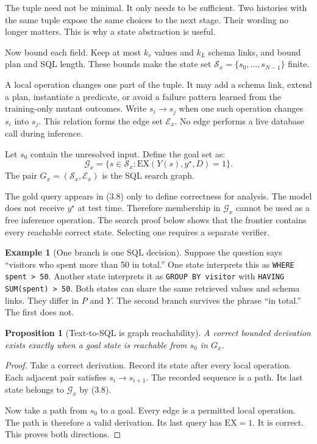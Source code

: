 \documentclass[11pt]{article}
\newtheorem{proposition}[theorem]{Proposition}
\theoremstyle{definition}
\newtheorem{example}[theorem]{Example}
\begin{document}
The tuple need not be minimal. It only needs to be sufficient. Two histories with the same tuple expose the same choices to the next stage. Their wording no longer matters. This is why a state abstraction is useful.

Now bound each field. Keep at most $k_v$ values and $k_L$ schema links, and bound plan and SQL length. These bounds make the state set $\mathcal S_x=\{s_0,\ldots,s_{N-1}\}$ finite.

A local operation changes one part of the tuple. It may add a schema link, extend a plan, instantiate a predicate, or avoid a failure pattern learned from the training-only mutant outcomes. Write $s_i\to s_j$ when one such operation changes $s_i$ into $s_j$. This relation forms the edge set $\mathcal E_x$. No edge performs a live database call during inference.

Let $s_0$ contain the unresolved input. Define the goal set as:
\[
\mathcal G_x=
\{s\in\mathcal S_x:\mathrm{EX}(Y(s),y^\star,D)=1\}.
\tag{3.8}
\]
The pair $G_x=(\mathcal S_x,\mathcal E_x)$ is the SQL search graph.

The gold query appears in (3.8) only to define correctness for analysis. The model does not receive $y^\star$ at test time. Therefore membership in $\mathcal G_x$ cannot be used as a free inference operation. The search proof below shows that the frontier contains every reachable correct state. Selecting one requires a separate verifier.

\begin{example}[One branch is one SQL decision]
Suppose the question says ``visitors who spent more than 50 in total.'' One state interprets this as \texttt{WHERE spent > 50}. Another state interprets it as \texttt{GROUP BY visitor} with \texttt{HAVING SUM(spent) > 50}. Both states can share the same retrieved values and schema links. They differ in $P$ and $Y$. The second branch survives the phrase ``in total.'' The first does not.
\end{example}

\begin{proposition}[Text-to-SQL is graph reachability]
\label{prop:sql-reachability}
A correct bounded derivation exists exactly when a goal state is reachable from $s_0$ in $G_x$.
\end{proposition}

\begin{proof}
Take a correct derivation. Record its state after every local operation. Each adjacent pair satisfies $s_i\to s_{i+1}$. The recorded sequence is a path. Its last state belongs to $\mathcal G_x$ by (3.8).

Now take a path from $s_0$ to a goal. Every edge is a permitted local operation. The path is therefore a valid derivation. Its last query has $\mathrm{EX}=1$. It is correct. This proves both directions.
\end{proof}
\end{document}
